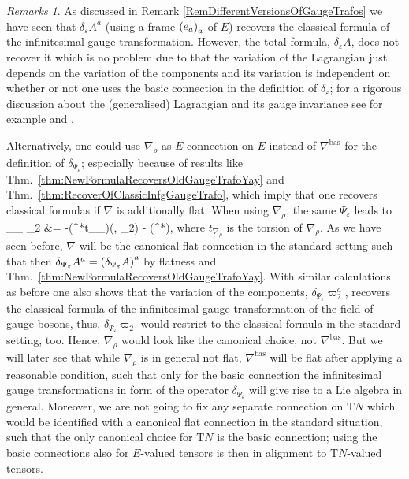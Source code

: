 \documentclass[a4paper,oneside,11pt]{scrartcl} %
\def\ba#1\ea{\begin{align}#1\end{align}}
\theoremstyle{plain}
\theoremstyle{remark}
\newtheorem{remark}[theorem]{Remarks}
\theoremstyle{definition}
\begin{document}
\begin{remark}\label{WhyNablaBasPartOne}
\leavevmode\newline
As discussed in Remark \ref{RemDifferentVersionsOfGaugeTrafos} we have seen that $\delta_\varepsilon A^a$ (using a frame $\mleft( e_a \mright)_a$ of $E$) recovers the classical formula of the infinitesimal gauge transformation. However, the total formula, $\delta_\varepsilon A$, does not recover it which is no problem due to that the variation of the Lagrangian just depends on the variation of the components and its variation is independent on whether or not one uses the basic connection in the definition of $\delta_\varepsilon$; for a rigorous discussion about the (generalised) Lagrangian and its gauge invariance see for example \cite{CurvedYMH} and \cite[\S 4]{MyThesis}.

Alternatively, one could use $\nabla_\rho$ as $E$-connection on $E$ instead of $\nabla^{\mathrm{bas}}$ for the definition of $\delta_{\Psi_\varepsilon}$; especially because of results like Thm.~\ref{thm:NewFormulaRecoversOldGaugeTrafoYay} and Thm.~\ref{thm:RecoverOfClassicInfgGaugeTrafo}, which imply that one recovers classical formulas if $\nabla$ is additionally flat.
When using $\nabla_\rho$, the same $\Psi_\varepsilon$ leads to
\ba
\delta_{\Psi_\varepsilon} \varpi_2
&=
-({}^*t_{\nabla_\rho})(\varepsilon, \varpi_2) - ({}^*\nabla)\varepsilon,
\ea
where $t_{\nabla_\rho}$ is the torsion of $\nabla_\rho$. As we have seen before, $\nabla$ will be the canonical flat connection in the standard setting such that then $\delta_{\Psi_\varepsilon} A^a = \mleft(\delta_{\Psi_\varepsilon} A \mright)^a$ by flatness and Thm.~\ref{thm:NewFormulaRecoversOldGaugeTrafoYay}. With similar calculations as before one also shows that the variation of the components, $\delta_{\Psi_\varepsilon} \varpi_2^a$, recovers the classical formula of the infinitesimal gauge transformation of the field of gauge bosons, thus, $\delta_{\Psi_\varepsilon} \varpi_2$ would restrict to the classical formula in the standard setting, too. Hence, $\nabla_\rho$ would look like the canonical choice, not $\nabla^{\mathrm{bas}}$. But we will later see that while $\nabla_\rho$ is in general not flat, $\nabla^{\mathrm{bas}}$ will be flat after applying a reasonable condition, such that only for the basic connection the infinitesimal gauge transformations in form of the operator $\delta_{\Psi_\varepsilon}$ will give rise to a Lie algebra in general. Moreover, we are not going to fix any separate connection on $\mathrm{T}N$ which would be identified with a canonical flat connection in the standard situation, such that the only canonical choice for $\mathrm{T}N$ is the basic connection; using the basic connections also for $E$-valued tensors is then in alignment to $\mathrm{T}N$-valued tensors.
\end{remark}
\end{document}
